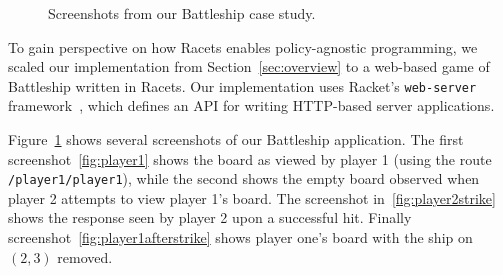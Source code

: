 \documentclass[review=true,acmlarge]{acmart}
\newcommand{\colorMATH}{black!20!blue}
\newcommand{\bmth}[1] {{\color{\colorMATH} $#1$}}
\begin{document}
\begin{figure}
  \quad
  \quad
  \vspace{.3in}
  \quad
  \caption{Screenshots from our Battleship case study.}
  \label{fig:case}
\end{figure}

To gain perspective on how Racets enables policy-agnostic programming,
we scaled our implementation from Section~\ref{sec:overview} to a
web-based game of Battleship written in Racets. Our implementation
uses Racket's \texttt{web-server} framework~\cite{webserver}, which
defines an API for writing HTTP-based server applications. 

Figure~\ref{fig:case} shows several screenshots of our Battleship
application. The first screenshot~\ref{fig:player1} shows the board as
viewed by player 1 (using the route \texttt{/player1/player1}),
while the second shows the empty board observed when player 2 attempts
to view player 1's board. The screenshot in~\ref{fig:player2strike}
shows the response seen by player 2 upon a successful hit. Finally
screenshot~\ref{fig:player1afterstrike} shows player one's board with
the ship on \bmth{(2,3)} removed.
\end{document}
